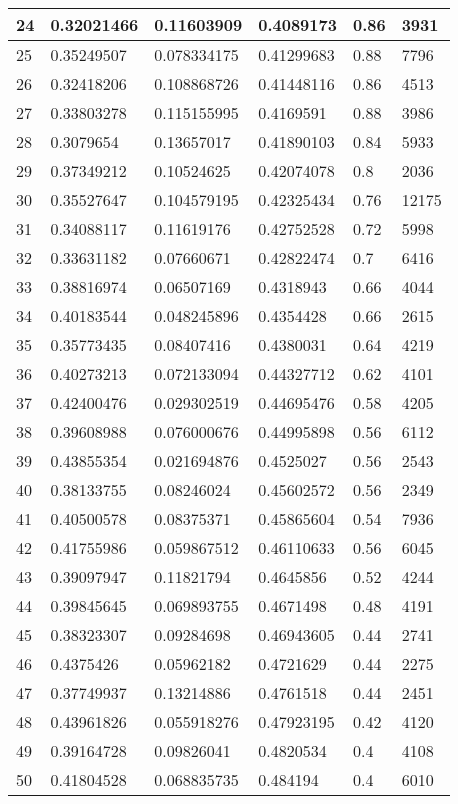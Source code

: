 \begin{longtable}{|l|l|l|l|l|l|}
24 & 0.32021466 & 0.11603909 & 0.4089173 & 0.86 & 3931 \\ \hline 
25 & 0.35249507 & 0.078334175 & 0.41299683 & 0.88 & 7796 \\ \hline 
26 & 0.32418206 & 0.108868726 & 0.41448116 & 0.86 & 4513 \\ \hline 
27 & 0.33803278 & 0.115155995 & 0.4169591 & 0.88 & 3986 \\ \hline 
28 & 0.3079654 & 0.13657017 & 0.41890103 & 0.84 & 5933 \\ \hline 
29 & 0.37349212 & 0.10524625 & 0.42074078 & 0.8 & 2036 \\ \hline 
30 & 0.35527647 & 0.104579195 & 0.42325434 & 0.76 & 12175 \\ \hline 
31 & 0.34088117 & 0.11619176 & 0.42752528 & 0.72 & 5998 \\ \hline 
32 & 0.33631182 & 0.07660671 & 0.42822474 & 0.7 & 6416 \\ \hline 
33 & 0.38816974 & 0.06507169 & 0.4318943 & 0.66 & 4044 \\ \hline 
34 & 0.40183544 & 0.048245896 & 0.4354428 & 0.66 & 2615 \\ \hline 
35 & 0.35773435 & 0.08407416 & 0.4380031 & 0.64 & 4219 \\ \hline 
36 & 0.40273213 & 0.072133094 & 0.44327712 & 0.62 & 4101 \\ \hline 
37 & 0.42400476 & 0.029302519 & 0.44695476 & 0.58 & 4205 \\ \hline 
38 & 0.39608988 & 0.076000676 & 0.44995898 & 0.56 & 6112 \\ \hline 
39 & 0.43855354 & 0.021694876 & 0.4525027 & 0.56 & 2543 \\ \hline 
40 & 0.38133755 & 0.08246024 & 0.45602572 & 0.56 & 2349 \\ \hline 
41 & 0.40500578 & 0.08375371 & 0.45865604 & 0.54 & 7936 \\ \hline 
42 & 0.41755986 & 0.059867512 & 0.46110633 & 0.56 & 6045 \\ \hline 
43 & 0.39097947 & 0.11821794 & 0.4645856 & 0.52 & 4244 \\ \hline 
44 & 0.39845645 & 0.069893755 & 0.4671498 & 0.48 & 4191 \\ \hline 
45 & 0.38323307 & 0.09284698 & 0.46943605 & 0.44 & 2741 \\ \hline 
46 & 0.4375426 & 0.05962182 & 0.4721629 & 0.44 & 2275 \\ \hline 
47 & 0.37749937 & 0.13214886 & 0.4761518 & 0.44 & 2451 \\ \hline 
48 & 0.43961826 & 0.055918276 & 0.47923195 & 0.42 & 4120 \\ \hline 
49 & 0.39164728 & 0.09826041 & 0.4820534 & 0.4 & 4108 \\ \hline 
50 & 0.41804528 & 0.068835735 & 0.484194 & 0.4 & 6010 \\ \hline 
\end{longtable}